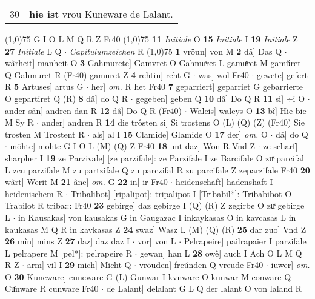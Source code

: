 \documentclass[8pt,a4paper,notitlepage]{article}
\begin{document}
\begin{table}[ht]
\begin{minipage}[t]{0.5\linewidth}
\begin{tabular}{rl}
30 & \textbf{hie ist} vrou Kuneware de Lalant.\\ 
\end{tabular}
\scriptsize
\line(1,0){75} \newline
G I O L M Q R Z Fr40 \newline
\line(1,0){75} \newline
\textbf{11} \textit{Initiale} O  \textbf{15} \textit{Initiale} I  \textbf{19} \textit{Initiale} Z  \textbf{27} \textit{Initiale} L Q   $\cdot$ \textit{Capitulumzeichen} R  \newline
\line(1,0){75} \newline
\textbf{1} vröun] von M \textbf{2} dâ] Das Q  $\cdot$ wârheit] manheit O \textbf{3} Gahmurete] Gamvret O Gahmuͯret L gamuͯret M gaműret Q Gahmuret R (Fr40) gamuret Z \textbf{4} rehtiu] reht G  $\cdot$ was] wol Fr40  $\cdot$ gewete] gefert R \textbf{5} Artuses] artus G  $\cdot$ her] \textit{om.} R het Fr40 \textbf{7} geparriert] geparriet G gebarrierte O gepartiret Q (R) \textbf{8} dâ] do Q R  $\cdot$ gegeben] geben Q \textbf{10} dâ] Do Q R \textbf{11} si] ÷i O  $\cdot$ ander sân] andren dan R \textbf{12} dâ] Do Q R (Fr40)  $\cdot$ Waleis] waleys O \textbf{13} bî] Hie bie M Sy R  $\cdot$ ander] andren R \textbf{14} die trôsten si] Si trostens O (L) (Q) (Z) (Fr40) Sie trosten M Trostent R  $\cdot$ als] al I \textbf{15} Clamide] Glamide O \textbf{17} der] \textit{om.} O  $\cdot$ dâ] do Q  $\cdot$ möhte] mohte G I O L (M) (Q) Z Fr40 \textbf{18} unt daz] Won R Vnd Z  $\cdot$ ze scharf] sharpher I \textbf{19} ze Parzivale] [ze parzifale]: ze Parzifale I ze Barcifale O zuͯ parcifal L zcu parzifale M zu partzifale Q zu parczifal R zu parcifale Z zeparzifale Fr40 \textbf{20} wârt] Werit M \textbf{21} âne] \textit{om.} G \textbf{22} in] ir Fr40  $\cdot$ heidenschaft] hadenshaft I heidenischem R  $\cdot$ Tribalibot] [ripalipot]: tripalipot I [Tribabil*]: Tribabibot O Trabilot R triba::: Fr40 \textbf{23} gebirge] daz gebirge I (Q) (R) Z zegirbe O zuͯ gebirge L  $\cdot$ in Kausakas] von kausakas G in Gaugazac I inkaykasas O in kavcasas L in kaukasas M Q R in kavkasas Z \textbf{24} swaz] Wasz L (M) (Q) (R) \textbf{25} dar zuo] Vnd Z \textbf{26} mîn] mins Z \textbf{27} daz] daz daz I  $\cdot$ vor] von L  $\cdot$ Pelrapeire] pailrapaier I parzifale L pelrapere M [pel*]: pelrapeire R  $\cdot$ gewan] han L \textbf{28} owê] auch I Ach O L M Q R Z  $\cdot$ arm] vil I \textbf{29} mich] Micht Q  $\cdot$ vröuden] freúnden Q vreude Fr40  $\cdot$ iuwer] \textit{om.} O \textbf{30} Kuneware] cuneware G (L) Gunwar I kvnware O kunwar M conware Q Cuͦnware R cunware Fr40  $\cdot$ de Lalant] delalant G L Q der lalant O von laland R \newline

\end{minipage}
\end{table}
\end{document}
